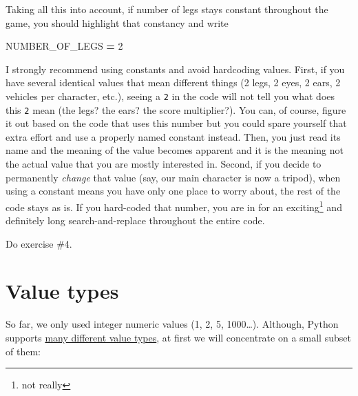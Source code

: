 \documentclass[
]{book}
\newenvironment{Shaded}{\begin{snugshade}}{\end{snugshade}}
\newcommand{\DecValTok}[1]{\textcolor[rgb]{0.00,0.00,0.81}{#1}}
\newcommand{\NormalTok}[1]{#1}
\newcommand{\OperatorTok}[1]{\textcolor[rgb]{0.81,0.36,0.00}{\textbf{#1}}}
\begin{document}
Taking all this into account, if number of legs stays constant throughout the game, you should highlight that constancy and write

\begin{Shaded}
\begin{Highlighting}[]
\NormalTok{NUMBER\_OF\_LEGS }\OperatorTok{=} \DecValTok{2}
\end{Highlighting}
\end{Shaded}

I strongly recommend using constants and avoid hardcoding values. First, if you have several identical values that mean different things (2 legs, 2 eyes, 2 ears, 2 vehicles per character, etc.), seeing a \texttt{2} in the code will not tell you what does this \texttt{2} mean (the legs? the ears? the score multiplier?). You can, of course, figure it out based on the code that uses this number but you could spare yourself that extra effort and use a properly named constant instead. Then, you just read its name and the meaning of the value becomes apparent and it is the meaning not the actual value that you are mostly interested in. Second, if you decide to permanently \emph{change} that value (say, our main character is now a tripod), when using a constant means you have only one place to worry about, the rest of the code stays as is. If you hard-coded that number, you are in for an exciting\footnote{not really} and definitely long search-and-replace throughout the entire code.

Do exercise \#4.

\hypertarget{value-types}{%
\section{Value types}\label{value-types}}

So far, we only used integer numeric values (1, 2, 5, 1000\ldots). Although, Python supports \href{https://docs.python.org/3/library/stdtypes.html}{many different value types}, at first we will concentrate on a small subset of them:
\end{document}
